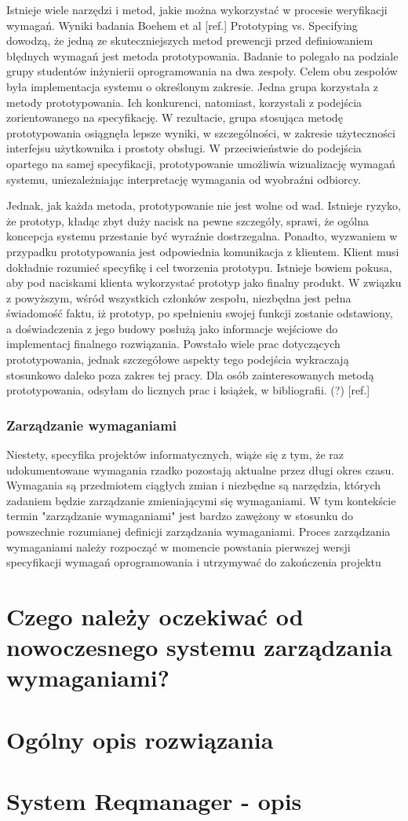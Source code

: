        Istnieje wiele narzędzi i metod, jakie można wykorzystać w procesie weryfikacji wymagań. Wyniki badania Boehem et al [ref.] Prototyping vs. Specifying dowodzą, że jedną ze skuteczniejszych metod prewencji przed definiowaniem błędnych wymagań jest metoda prototypowania. Badanie to polegało na podziale grupy studentów inżynierii oprogramowania na dwa zespoły. Celem obu zespołów była implementacja systemu o określonym zakresie. Jedna grupa korzystała z metody prototypowania. Ich konkurenci, natomiast, korzystali z podejścia zorientowanego na specyfikację. W rezultacie, grupa stosująca metodę prototypowania osiągnęła lepsze wyniki, w szczególności, w zakresie użyteczności interfejsu użytkownika i prostoty obsługi. W przeciwieństwie do podejścia opartego na samej specyfikacji, prototypowanie umożliwia wizualizację wymagań systemu, uniezależniając interpretację wymagania od wyobraźni odbiorcy. 

        Jednak, jak każda metoda, prototypowanie nie jest wolne od wad. Istnieje ryzyko, że prototyp, kładąc zbyt duży nacisk na pewne szczegóły, sprawi, że ogólna koncepcja systemu przestanie być wyraźnie dostrzegalna. Ponadto, wyzwaniem w przypadku prototypowania jest odpowiednia komunikacja z klientem. Klient musi dokładnie rozumieć specyfikę i cel tworzenia prototypu. Istnieje bowiem pokusa, aby pod naciskami klienta wykorzystać prototyp jako finalny produkt. W związku z powyższym, wśród wszystkich członków zespołu, niezbędna jest pełna świadomość faktu, iż prototyp, po spełnieniu swojej funkcji zostanie odstawiony, a doświadczenia z jego budowy posłużą jako informacje wejściowe do implementacj finalnego rozwiązania. Powstało wiele prac dotyczących prototypowania, jednak szczegółowe aspekty tego podejścia wykraczają stosunkowo daleko poza zakres tej pracy. Dla osób zainteresowanych metodą prototypowania, odsyłam do licznych prac i książek, w bibliografii. (?) [ref.] 

      \subsubsection{Zarządzanie wymaganiami}

        Niestety, specyfika projektów informatycznych, wiąże się z tym, że raz udokumentowane wymagania rzadko pozostają aktualne przez długi okres czasu. Wymagania są przedmiotem ciągłych zmian i niezbędne są narzędzia, których zadaniem będzie zarządzanie zmieniającymi się wymaganiami. W tym kontekście termin "zarządzanie wymaganiami" jest bardzo zawężony w stosunku do powszechnie rozumianej definicji zarządzania wymaganiami. Proces zarządzania wymaganiami należy rozpocząć w momencie powstania pierwszej wersji specyfikacji wymagań oprogramowania i utrzymywać do zakończenia projektu 

  \section{Czego należy oczekiwać od nowoczesnego systemu zarządzania wymaganiami?}
  \section{Ogólny opis rozwiązania}
  \section{System Reqmanager - opis}
